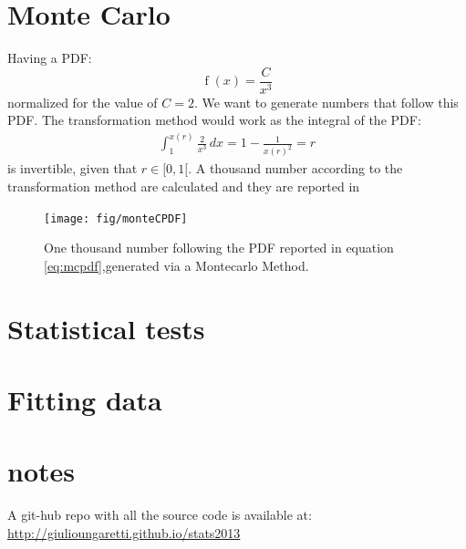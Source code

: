 \documentclass[twocolumn]{article}
\begin{document}
\section{Monte Carlo} %
\label{sec:monte_carlo}
 Having a PDF:
 \begin{equation}
 \label{eq:mcpdf}
 	\operatorname{f}{\left (x \right )} = \frac{C}{x^{3}}
 \end{equation}
 normalized for the value of $C=2$.
 We want to generate numbers that follow this PDF. 
 The transformation method would  work as the integral of the PDF:
 \begin{multline}
 	\int_{1}^{x(r)} \frac{2}{x^{3}}\, dx = 1 - \frac{1}{x(r)^{2}} = r
 \end{multline}
is  invertible, given that $r \in [0,1[$. 
A thousand number according to the transformation method are calculated and they are reported in 

\begin{figure}[h!]
	\begin{center}
		\texttt{[image: fig/monteCPDF]}
	\end{center}
	\caption{One thousand number following the PDF reported in equation \ref{eq:mcpdf},generated via a Montecarlo Method.}
	\label{fig:figure1}
\end{figure}

\section{Statistical tests} %
\label{sec:statistical_tests}



\section{Fitting data} %
\label{sec:fitting_data}

\section{notes}
A git-hub repo with all the source code is available at:
\url{http://giulioungaretti.github.io/stats2013}
\end{document}
